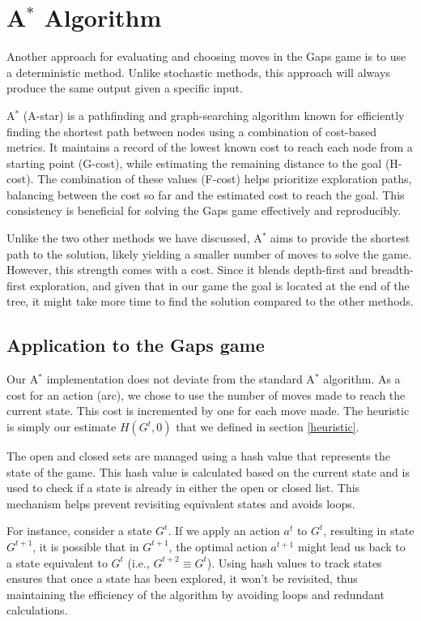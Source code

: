 \chapter{A$^*$ Algorithm}
Another approach for evaluating and choosing moves in the Gaps game is to use a deterministic method. Unlike stochastic methods, this approach will always produce the same output given a specific input.

A$^*$ (A-star) is a pathfinding and graph-searching algorithm known for efficiently finding the shortest path between nodes using a combination of cost-based metrics. It maintains a record of the lowest known cost to reach each node from a starting point (G-cost), while estimating the remaining distance to the goal (H-cost). The combination of these values (F-cost) helps prioritize exploration paths, balancing between the cost so far and the estimated cost to reach the goal. This consistency is beneficial for solving the Gaps game effectively and reproducibly.

Unlike the two other methods we have discussed, A$^*$ aims to provide the shortest path to the solution, likely yielding a smaller number of moves to solve the game. However, this strength comes with a cost. Since it blends depth-first and breadth-first exploration, and given that in our game the goal is located at the end of the tree, it might take more time to find the solution compared to the other methods.

\section{Application to the Gaps game}
Our A$^*$ implementation does not deviate from the standard A$^*$ algorithm. As a cost for an action (arc), we chose to use the number of moves made to reach the current state. This cost is incremented by one for each move made. The heuristic is simply our estimate $H(G^t, 0)$ that we defined in section \ref{heuristic}.

The open and closed sets are managed using a hash value that represents the state of the game. This hash value is calculated based on the current state and is used to check if a state is already in either the open or closed list. This mechanism helps prevent revisiting equivalent states and avoids loops.

For instance, consider a state $G^t$. If we apply an action $ a^t$ to $G^t$, resulting in state $G^{t+1}$, it is possible that in $G^{t+1}$, the optimal action $a^{t+1}$ might lead us back to a state equivalent to $G^t$ (i.e., $G^{t+2} \equiv G^t$). Using hash values to track states ensures that once a state has been explored, it won't be revisited, thus maintaining the efficiency of the algorithm by avoiding loops and redundant calculations.

